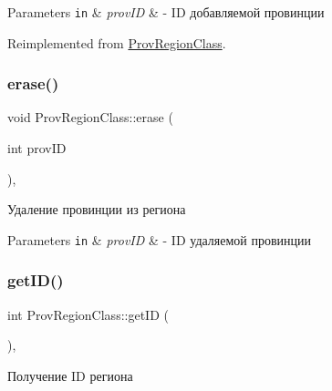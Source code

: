 \begin{DoxyParams}[1]{Parameters}
\mbox{\tt in}  & {\em prov\+ID} & -\/ ID добавляемой провинции \\
\hline
\end{DoxyParams}


Reimplemented from \hyperlink{class_prov_region_class_a47f41cef997877d288ea420dca7b9e81}{Prov\+Region\+Class}.

\mbox{\label{class_prov_region_class_ad28dbe98716517339922d6c4e0433611}} 
\subsubsection{\texorpdfstring{erase()}{erase()}}
{\footnotesize\ttfamily void Prov\+Region\+Class\+::erase (\begin{DoxyParamCaption}\item[{int}]{prov\+ID }\end{DoxyParamCaption})\hspace{0.3cm}{\ttfamily [virtual]}, {\ttfamily [inherited]}}



Удаление провинции из региона 


\begin{DoxyParams}[1]{Parameters}
\mbox{\tt in}  & {\em prov\+ID} & -\/ ID удаляемой провинции \\
\hline
\end{DoxyParams}
\mbox{\label{class_prov_region_class_ab6f83c85a913b7f9ac3f6839b3386793}} 
\subsubsection{\texorpdfstring{get\+I\+D()}{getID()}}
{\footnotesize\ttfamily int Prov\+Region\+Class\+::get\+ID (\begin{DoxyParamCaption}{ }\end{DoxyParamCaption})\hspace{0.3cm}{\ttfamily [virtual]}, {\ttfamily [inherited]}}



Получение ID региона 

